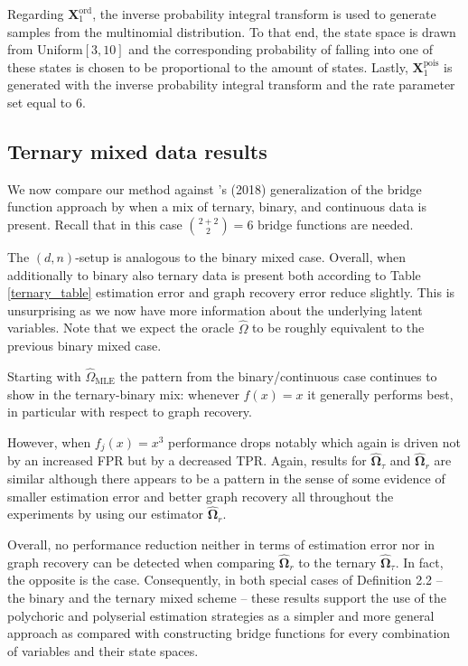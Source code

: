 Regarding $\boldsymbol{X}_1^{\text{ord}}$, the inverse probability integral transform is used to generate samples from the multinomial distribution. To that end, the state space is drawn from Uniform$[3,10]$ and the corresponding probability of falling into one of these states is chosen to be proportional to the amount of states. Lastly, $\boldsymbol{X}_1^{\text{pois}}$ is generated with the inverse probability integral transform and the rate parameter set equal to $6$. 

\subsection{Ternary mixed data results}

We now compare our method against \citeauthor{Quan18}'s (2018) generalization of the bridge function approach by \citet{Fan17} when a mix of ternary, binary, and continuous data is present. Recall that in this case $ \binom{2+2}{2} = 6$ bridge functions are needed.      

The $(d,n)$-setup is analogous to the binary mixed case. Overall, when additionally to binary also ternary data is present both according to Table \ref{ternary_table} estimation error and graph recovery error reduce slightly. This is unsurprising as we now have more information about the underlying latent variables. Note that we expect the oracle $\hat{\Omega}$ to be roughly equivalent to the previous binary mixed case.

Starting with $\hat{\Omega}_{\text{MLE}}$ the pattern from the binary/continuous case continues to show in the ternary-binary mix: whenever $f(x)=x$ it generally performs best, in particular with respect to graph recovery.


However, when $f_j(x)=x^3$ performance drops notably which again is driven not by an increased FPR but by a decreased TPR. 
Again, results for $\hat{\boldsymbol\Omega}_\tau$ and $\hat{\boldsymbol\Omega}_r$ are similar although there appears to be a pattern in the sense of some evidence of smaller estimation error and better graph recovery all throughout the experiments by using our estimator $\hat{\boldsymbol\Omega}_r$.     

Overall, no performance reduction neither in terms of estimation error nor in graph recovery can be detected when comparing $\hat{\boldsymbol\Omega}_r$ to the ternary $\hat{\boldsymbol\Omega}_\tau$. In fact, the opposite is the case. Consequently, in both special cases of Definition 2.2 %
-- the binary and the ternary mixed scheme -- 
these results support the use of the polychoric and polyserial estimation strategies as a simpler and more general approach as compared with constructing bridge functions for every combination of variables and their state spaces. 
 



